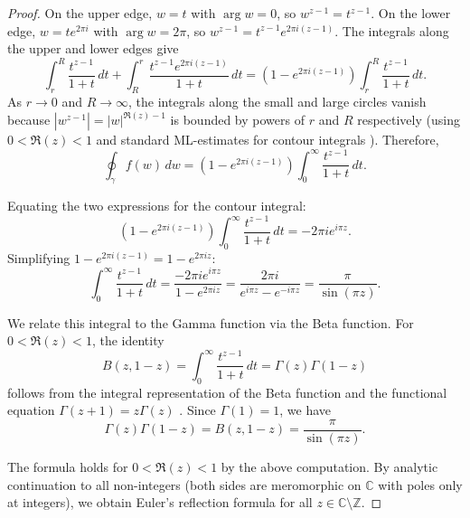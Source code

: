\begin{proof}
	On the upper edge, $w = t$ with $\arg w = 0$, so $w^{z-1} = t^{z-1}$. On the lower edge, $w = t e^{2\pi i}$ with $\arg w = 2\pi$, so $w^{z-1} = t^{z-1} e^{2\pi i(z-1)}$. The integrals along the upper and lower edges give
	$$\int_r^R \frac{t^{z-1}}{1+t}\,dt + \int_R^r \frac{t^{z-1}e^{2\pi i(z-1)}}{1+t}\,dt = (1 - e^{2\pi i(z-1)}) \int_r^R \frac{t^{z-1}}{1+t}\,dt.$$
	As $r \to 0$ and $R \to \infty$, the integrals along the small and large circles vanish because $|w^{z-1}| = |w|^{\Re(z)-1}$ is bounded by powers of $r$ and $R$ respectively (using $0 < \Re(z) < 1$ and standard ML-estimates for contour integrals ). Therefore,
	$$\oint_\gamma f(w)\,dw = (1 - e^{2\pi i(z-1)}) \int_0^\infty \frac{t^{z-1}}{1+t}\,dt.$$

	Equating the two expressions for the contour integral:
	$$(1 - e^{2\pi i(z-1)}) \int_0^\infty \frac{t^{z-1}}{1+t}\,dt = -2\pi i e^{i\pi z}.$$
	Simplifying $1 - e^{2\pi i(z-1)} = 1 - e^{2\pi i z}$:
	$$\int_0^\infty \frac{t^{z-1}}{1+t}\,dt = \frac{-2\pi i e^{i\pi z}}{1 - e^{2\pi i z}} = \frac{2\pi i}{e^{i\pi z} - e^{-i\pi z}} = \frac{\pi}{\sin(\pi z)}.$$

	We relate this integral to the Gamma function via the Beta function. For $0 < \Re(z) < 1$, the identity
	$$B(z, 1-z) = \int_0^\infty \frac{t^{z-1}}{1+t}\,dt = \Gamma(z)\Gamma(1-z)$$
	follows from the integral representation of the Beta function and the functional equation $\Gamma(z+1) = z\Gamma(z)$ . Since $\Gamma(1) = 1$, we have
	$$\Gamma(z)\Gamma(1-z) = B(z, 1-z) = \frac{\pi}{\sin(\pi z)}.$$

	The formula holds for $0 < \Re(z) < 1$ by the above computation. By analytic continuation to all non-integers (both sides are meromorphic on $\mathbb{C}$ with poles only at integers), we obtain Euler's reflection formula for all $z \in \mathbb{C} \setminus \mathbb{Z}$.
\end{proof}
